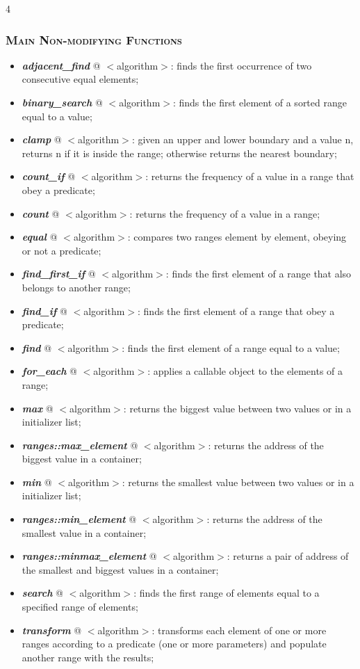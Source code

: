 \documentclass[10pt]{article}
\begin{document}
\begin{multicols*}{4}
{\subsubsection*{\textsc{Main Non-modifying Functions}} 
\begin{itemize}[leftmargin=*,topsep=0.25pt]
  \setlength\itemsep{-1.8pt}
	\item  \emph{\textbf{adjacent\_find}} @ $<$algorithm$>$: finds the first occurrence of two consecutive equal elements;
	\item  \emph{\textbf{binary\_search}} @ $<$algorithm$>$: finds the first element of a sorted range equal to a value;  
	\item  \emph{\textbf{clamp}} @ $<$algorithm$>$: given an upper and lower boundary and a value n, returns n if it is inside the range; otherwise returns the nearest boundary;  
	\item  \emph{\textbf{count\_if}} @ $<$algorithm$>$: returns the frequency of a value in a range that obey a predicate;
	\item  \emph{\textbf{count}} @ $<$algorithm$>$: returns the frequency of a value in a range; 
	\item  \emph{\textbf{equal}} @ $<$algorithm$>$: compares two ranges element by element, obeying or not a predicate;  
	\item  \emph{\textbf{find\_first\_if}} @ $<$algorithm$>$: finds the first element of a range that also belongs to another range;  
	\item  \emph{\textbf{find\_if}} @ $<$algorithm$>$: finds the first element of a range that obey a predicate;
	\item  \emph{\textbf{find}} @ $<$algorithm$>$: finds the first element of a range equal to a value; 
	\item  \emph{\textbf{for\_each}} @ $<$algorithm$>$: applies a callable object to the elements of a range;
	\item  \emph{\textbf{max}} @ $<$algorithm$>$: returns the biggest value between two values or in a initializer list;  
	\item  \emph{\textbf{ranges::max\_element}} @ $<$algorithm$>$: returns the address of the biggest value in a container;  
	\item  \emph{\textbf{min}} @ $<$algorithm$>$: returns the smallest value between two values or in a initializer list;  
	\item  \emph{\textbf{ranges::min\_element}} @ $<$algorithm$>$: returns the address of the smallest value in a container;  
	\item  \emph{\textbf{ranges::minmax\_element}} @ $<$algorithm$>$: returns a pair of address of the smallest and biggest values in a container;  	
	\item  \emph{\textbf{search}} @ $<$algorithm$>$: finds the first range of elements equal to a specified range of elements;  
	\item  \emph{\textbf{transform}} @ $<$algorithm$>$: transforms each element of one or more ranges according to a predicate (one or more parameters) and populate another range with the results;  
\end{itemize}

}
\end{multicols*}
\end{document}
